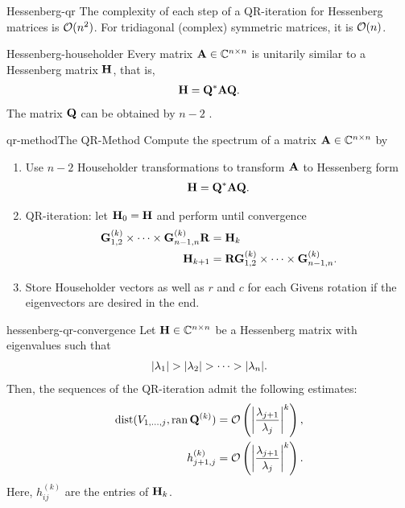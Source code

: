 \begin{Corollary}{Hessenberg-qr}
  The complexity of each step of a QR-iteration for Hessenberg matrices is $\bigo(n^2)$. For tridiagonal (complex) symmetric matrices, it is $\bigo(n)$.
\end{Corollary}

\begin{Theorem}{Hessenberg-householder}
  Every matrix $\mata\in\Cnn$ is unitarily similar to a Hessenberg matrix $\matH$, that is,
  \begin{gather}
    \matH = \matq^* \mata \matq.
  \end{gather}
  The matrix $\matq$ can be obtained by $n-2$ .
\end{Theorem}

\begin{Algorithm*}{qr-method}{The QR-Method}
  Compute the spectrum of a matrix $\mata\in\Cnn$ by
  \begin{enumerate}
  \item Use $n-2$ Householder transformations to transform $\mata$ to
    Hessenberg form
    \begin{gather}
     \matH = \matq^*\mata\matq.
   \end{gather}
 \item QR-iteration: let $\matH_{0}=\matH$ and perform until convergence
   \begin{align}
     \givens^{(k)}_{1,2}\times\dots\times\givens^{(k)}_{n-1,n} \matr &= \matH_k\\
     \matH_{k+1} &= \matr \givens^{(k)}_{1,2}\times\dots\times\givens^{(k)}_{n-1,n}.
   \end{align}
 \item Store Householder vectors as well as $r$ and $c$ for each
   Givens rotation if the eigenvectors are desired in the end.
  \end{enumerate}
\end{Algorithm*}

\begin{Theorem}{hessenberg-qr-convergence}
    Let $\matH\in\Cnn$ be a Hessenberg matrix with eigenvalues such that
  \begin{gather}
    \abs{\lambda_1} >
    \abs{\lambda_2}>\dots>\abs{\lambda_n}.
  \end{gather}
  Then, the sequences of the QR-iteration admit the following estimates:
  \begin{align}
    \dist(\esp{1,\dots,j},\ran{\matq^{(k)}}) &= \bigo \left(\abs*{\frac{\lambda_{j+1}}{\lambda_j}}^k\right),
    \\
    h_{j+1,j}^{(k)} &= \bigo \left(\abs*{\frac{\lambda_{j+1}}{\lambda_j}}^k\right)
                      .
  \end{align}
  Here, $h_{ij}^{(k)}$ are the entries of $\matH_k$.
\end{Theorem}

